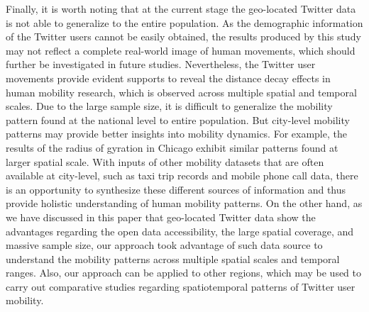 \documentclass[ijgi,article,accept,moreauthors,pdftex,10pt,a4paper]{mdpi}
\theoremstyle{mdpi}
\newcounter{ex}
\newcounter{re}
\theoremstyle{mdpidefinition}
\begin{document}
Finally, it is worth noting that at the current stage the geo-located Twitter data is not able to generalize to the entire population.
As the demographic information of the Twitter users cannot be easily obtained, the results produced by this study may not reflect a complete real-world image of human movements, which should further be investigated in future studies.
Nevertheless, the Twitter user movements provide evident supports to reveal the distance decay effects in human mobility research, which is observed across multiple spatial and temporal scales.
Due to the large sample size, it is difficult to generalize the mobility pattern found at the national level to entire population.
But city-level mobility patterns may provide better insights into mobility dynamics. For example, the results of the radius of gyration in Chicago exhibit similar patterns found at larger spatial scale.
With inputs of other mobility datasets that are often available at city-level, such as taxi trip records and mobile phone call data, there is an opportunity to synthesize these different sources of information and thus provide holistic understanding of human mobility patterns.
On the other hand, as we have discussed in this paper that geo-located Twitter data show the advantages regarding the open data accessibility, the large spatial coverage, and massive sample size, our approach took advantage of such data source to understand the mobility patterns across multiple spatial scales and temporal ranges.
Also, our approach can be applied to other regions, which may be used to carry out comparative studies regarding spatiotemporal patterns of Twitter user mobility. 



\end{document}
